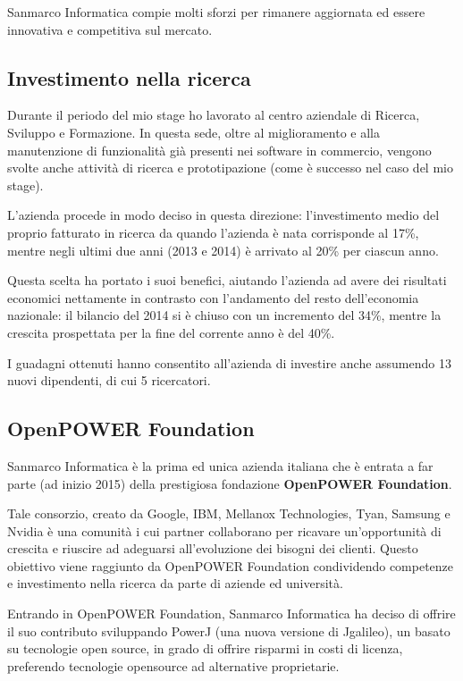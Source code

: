 Sanmarco Informatica compie molti sforzi per rimanere aggiornata ed essere
innovativa e competitiva sul mercato.

\subsection{Investimento nella ricerca} \mbox{}

Durante il periodo del mio stage ho lavorato al centro aziendale di Ricerca,
Sviluppo e Formazione. In questa sede, oltre al miglioramento e alla
manutenzione di funzionalità già presenti nei software in commercio, vengono
svolte anche attività di ricerca e prototipazione (come è successo nel caso
del mio stage).

L'azienda procede in modo deciso in questa direzione: l'investimento medio del
proprio fatturato in ricerca da quando l'azienda è nata corrisponde al 17\%,
mentre negli ultimi due anni (2013 e 2014) è arrivato al 20\% per ciascun anno.

Questa scelta ha portato i suoi benefici, aiutando l'azienda ad avere dei
risultati economici nettamente in contrasto con l'andamento del resto
dell'economia nazionale: il bilancio del 2014 si è chiuso con un incremento del
34\%, mentre la crescita prospettata per la fine del corrente anno è del 40\%.

I guadagni ottenuti hanno consentito all'azienda di investire anche assumendo
13 nuovi dipendenti, di cui 5 ricercatori.

\subsection{OpenPOWER Foundation} \mbox{}

Sanmarco Informatica è la prima ed unica azienda italiana che è entrata a far
parte (ad inizio 2015) della prestigiosa fondazione \textbf{OpenPOWER
Foundation}.

Tale consorzio, creato da Google, IBM, Mellanox Technologies, Tyan, Samsung e
Nvidia è una comunità i cui partner collaborano per ricavare un'opportunità di
crescita e riuscire ad adeguarsi all'evoluzione dei bisogni dei clienti.
Questo obiettivo viene raggiunto da OpenPOWER Foundation condividendo
competenze e investimento nella ricerca da parte di aziende ed università.

Entrando in OpenPOWER Foundation, Sanmarco Informatica ha deciso di offrire il
suo contributo sviluppando PowerJ (una nuova versione di Jgalileo), un
 basato su tecnologie open source, in grado di offrire risparmi in
costi di licenza, preferendo tecnologie opensource ad alternative proprietarie.

